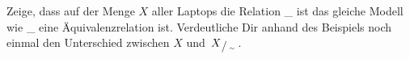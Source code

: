  \begin{aufg}[Laptops] \label{laptopaufg}
Zeige, dass auf der Menge $X$ aller Laptops die Relation \glqq\_ ist das gleiche Modell wie \_ \grqq eine Äquivalenzrelation ist. Verdeutliche Dir anhand des Beispiels noch einmal den Unterschied zwischen $X$ und $\sfrac{X}{\sim}$.
\end{aufg}

 

